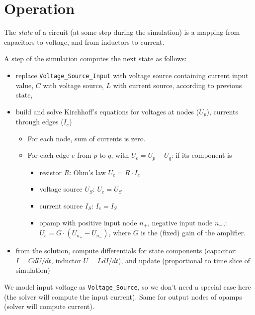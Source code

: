 \documentclass{article}
\begin{document}
\section{Operation}

The \emph{state} of a circuit (at some step during the simulation)
is a mapping from capacitors to voltage,
and from inductors to current.

A step of the simulation computes the next state as follows:
\begin{itemize}
\item replace  \verb|Voltage_Source_Input| with voltage source containing current input value,
  $C$ with voltage source, $L$ with current source, according to previous state,
\item build and solve Kirchhoff's equations for voltages at nodes ($U_p$), currents through edges ($I_e$)
  \begin{itemize}
  \item For each node, sum of currents is zero. 
  \item For each edge $e$ from $p$ to $q$, with $U_e=U_p-U_q$: if its component is
    \begin{itemize}
    \item resistor $R$: Ohm's law $U_e = R\cdot I_e$
    \item voltage source $U_S$: $U_e=U_S$
    \item current source $I_S$: $I_e = I_S$
    \item opamp with positive input node $n_+$, negative input node $n_-$,:
      $U_e=G\cdot(U_{n_+}-U_{n_-})$, where $G$ is the (fixed) gain of the amplifier.
    \end{itemize}
  \end{itemize}
\item from the solution, compute differentials for state components
(capacitor: $I = C dU/dt$, inductor $U = L dI/dt$), and update (proportional to time slice of simulation)
\end{itemize}

We model input voltage as \verb|Voltage_Source|,
so we don't need a special case here (the solver will compute the input current).
Same for output nodes of opamps (solver will compute current).
\end{document}
